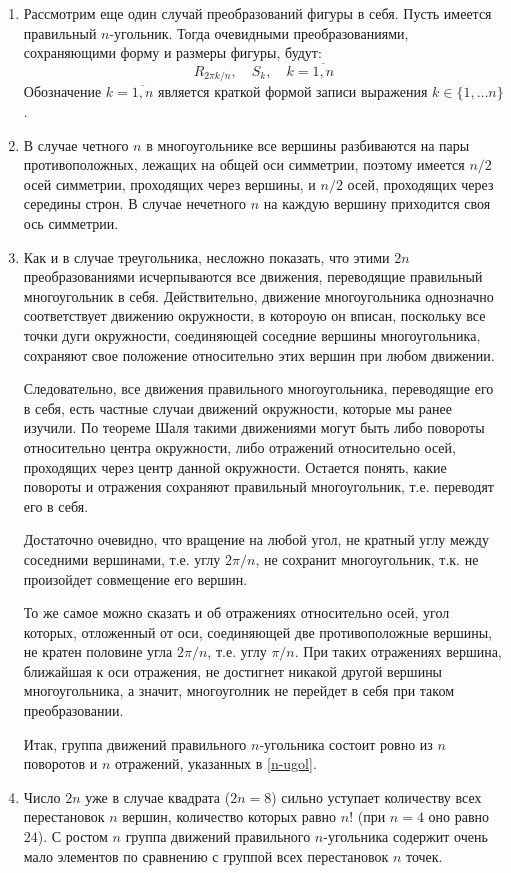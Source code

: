 \begin{enumerate}
\item Рассмотрим еще один случай преобразований фигуры в себя. Пусть имеется правильный $n$-угольник. Тогда очевидными преобразованиями, сохраняющими форму и размеры фигуры, будут:
\begin{equation}\label{n-ugol}
R_{2\pi k/n},\quad S_k,\quad k=\overline{1,n}
\end{equation}
Обозначение $k=\overline{1,n}$ является краткой формой записи выражения $k\in\{1,\dots n\}$.
\item В случае четного $n$ в многоугольнике все вершины разбиваются на пары противоположных, лежащих на общей оси симметрии, поэтому имеется $n/2$ осей симметрии, проходящих через вершины, и $n/2$ осей, проходящих через середины строн. В случае нечетного $n$ на каждую вершину приходится своя ось симметрии.
\item Как и в случае треугольника, несложно показать, что этими $2n$ преобразованиями исчерпываются все движения, переводящие правильный многоугольник в себя. Действительно, движение многоугольника однозначно соответствует движению окружности, в котороую он вписан, поскольку все точки дуги окружности, соединяющей соседние вершины многоугольника, сохраняют свое положение относительно этих вершин при любом движении.

Следовательно, все движения правильного многоугольника, переводящие его в себя, есть частные случаи движений окружности, которые мы ранее изучили. По теореме Шаля такими движениями могут быть либо повороты относительно центра окружности, либо отражений относительно осей, проходящих через центр данной окружности. Остается понять, какие повороты и отражения сохраняют правильный многоугольник, т.е. переводят его в себя.

Достаточно очевидно, что вращение на любой угол, не кратный углу между соседними вершинами, т.е. углу $2\pi/n$, не сохранит многоугольник, т.к. не произойдет совмещение его вершин.

То же самое можно сказать и об отражениях относительно осей, угол которых, отложенный от оси, соединяющей две противоположные вершины, не кратен половине угла $2\pi/n$, т.е. углу $\pi/n$. При таких отражениях вершина, ближайшая к оси отражения, не достигнет никакой другой вершины многоугольника, а значит, многоуголник не перейдет в себя при таком преобразовании.

Итак, группа движений правильного $n$-угольника состоит ровно из $n$ поворотов и $n$ отражений, указанных в \eqref{n-ugol}.

\item Число $2n$ уже в случае квадрата ($2n=8$) сильно уступает количеству всех перестановок $n$ вершин, количество которых равно $n!$ (при $n=4$ оно равно $24$). С ростом $n$ группа движений правильного $n$-угольника содержит очень мало элементов по сравнению с группой всех перестановок $n$ точек.
\end{enumerate}
